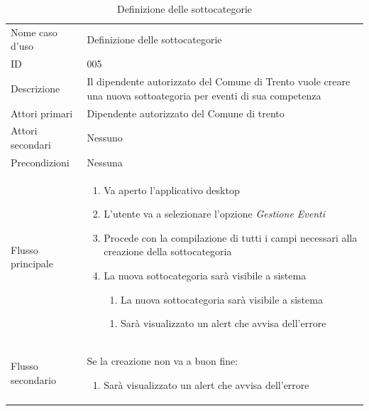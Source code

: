 \documentclass{article}
\begin{document}
\begin{table}[htbp]
    \label{8.3.1}
    \centering
    \begin{tabularx}{\textwidth}{| l | p{} |}
        \Xhline{2pt} %
        Nome caso d'uso & Definizione delle sottocategorie \\
        \Xhline{2pt} %
        ID & 005 \\
        \hline
        Descrizione & Il dipendente autorizzato del Comune di Trento vuole creare una nuova sottoategoria per eventi di sua competenza\\
        \hline
        Attori primari & Dipendente autorizzato del Comune di trento\\
        \hline
        Attori secondari & Nessuno \\
        \hline
        Precondizioni & Nessuna \\
        \hline
        Flusso principale & 
        \begin{enumerate}[topsep=5pt,partopsep=0pt,parsep=0pt,itemsep=0pt,before=\vspace{-\baselineskip},after=\vspace{-\baselineskip}]                
            \item Va aperto l'applicativo desktop
            \item L'utente va a selezionare l'opzione \textit{Gestione Eventi}
            \item Procede con la compilazione di tutti i campi necessari alla creazione della sottocategoria
            \item La nuova sottocategoria sarà visibile a sistema
            \begin{enumerate}[leftmargin=*, nosep]
                \item La nuova sottocategoria sarà visibile a sistema
            \end{enumerate}
            \begin{enumerate}[leftmargin=*, nosep]
                \item Sarà visualizzato un alert che avvisa dell'errore
            \end{enumerate}
        \end{enumerate}
        \\
        \hline
        Flusso secondario & 
        Se la creazione non va a buon fine:
        \begin{enumerate}[topsep=10pt,partopsep=0pt,parsep=0pt,itemsep=0pt,before=\vspace{-\baselineskip},after=\vspace{-\baselineskip}]                
            \item Sarà visualizzato un alert che avvisa dell'errore
        \end{enumerate}
        \\
        \hline
    \end{tabularx}
    \caption{Definizione delle sottocategorie}
    \label{tab:tabella_use_case006}
\end{table}
\end{document}
